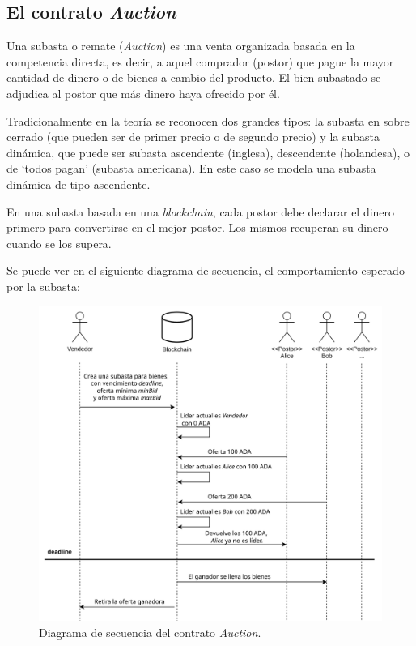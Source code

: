 \documentclass[12pt]{book}
\begin{document}
\subsection{El contrato \textit{Auction}}

Una subasta o remate (\textit{Auction}) es una venta organizada basada en la competencia directa, es decir, a aquel comprador (postor) que pague la mayor cantidad de dinero o de bienes a cambio del producto. El bien subastado se adjudica al postor que más dinero haya ofrecido por él.

Tradicionalmente en la teoría se reconocen dos grandes tipos: la subasta en sobre cerrado (que pueden ser de primer precio o de segundo precio) y la subasta dinámica, que puede ser subasta ascendente (inglesa), descendente (holandesa), o de `todos pagan' (subasta americana). En este caso se modela una subasta dinámica de tipo ascendente.

En una subasta basada en una \textit{blockchain}, cada postor debe declarar el dinero primero para convertirse en el mejor postor. Los mismos recuperan su dinero cuando se los supera.

Se puede ver en el siguiente diagrama de secuencia, el comportamiento esperado por la subasta:

\begin{figure}[H]
    \centering
    \includegraphics[width=\textwidth]{Auction.png}
    \caption{Diagrama de secuencia del contrato \textit{Auction}.}\label{fig:Auction}
\end{figure}
\end{document}
